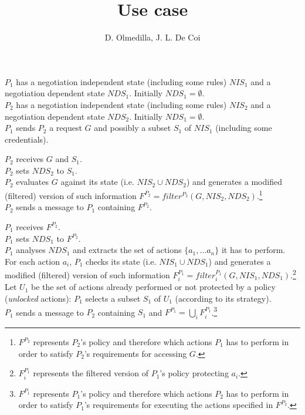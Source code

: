 \documentclass{article}
\begin{document}
\title{Use case}
\author{D. Olmedilla, J. L. De Coi}
\maketitle

$P_{1}$ has a negotiation independent state (including some rules) $NIS_{1}$ and a negotiation dependent state $NDS_{1}$. Initially $NDS_{1} = \emptyset$.\\
$P_{2}$ has a negotiation independent state (including some rules) $NIS_{2}$ and a negotiation dependent state $NDS_{2}$. Initially $NDS_{1} = \emptyset$.\\
$P_{1}$ sends $P_{2}$ a request $G$ and possibly a subset $S_{1}$ of $NIS_{1}$ (including some credentials).

$P_{2}$ receives $G$ and $S_{1}$.\\
$P_{2}$ sets $NDS_{2}$ to $S_{1}$.\\
$P_{2}$ evaluates $G$ against its state (i.e. $NIS_{2} \cup NDS_{2}$) and generates a modified (filtered) version of such information $F^{P_{2}} = filter^{P_{2}}(G, NIS_{2}, NDS_{2})$.\footnote{$F^{P_{2}}$ represents $P_{2}$'s policy and therefore which actions $P_{1}$ has to perform in order to satisfy $P_{2}$'s requirements for accessing $G$.}\\
$P_{2}$ sends a message to $P_{1}$ containing $F^{P_{2}}$.

$P_{1}$ receives $F^{P_{2}}$.\\
$P_{1}$ sets $NDS_{1}$ to $F^{P_{2}}$.\\
$P_{1}$ analyses $NDS_{1}$ and extracts the set of actions $\{a_{1}, ... a_{n}\}$ it has to perform.\\
For each action $a_{i}$,  $P_{1}$ checks its state (i.e. $NIS_{1} \cup NDS_{1}$) and generates a modified (filtered) version of such information $F^{P_{1}}_{i} = filter^{P_{1}}_{i}(G, NIS_{1}, NDS_{1}).$\footnote{$F^{P_{1}}_{i}$ represents the filtered version of $P_{1}$'s policy protecting $a_{i}$.}\\
Let $U_{1}$ be the set of actions already performed or not protected by a policy (\textit{unlocked} actions): $P_{1}$ selects a subset $S_{1}$ of $U_{1}$ (according to its strategy).\\
$P_{1}$ sends a message to $P_{2}$ containing $S_{1}$ and $F^{P_{1}} = \bigcup_{i}F^{P_{1}}_{i}$.\footnote{$F^{P_{1}}$ represents $P_{1}$'s policy and therefore which actions $P_{2}$ has to perform in order to satisfy $P_{1}$'s requirements for executing the actions specified in $F^{P_{2}}$.}
\end{document}
